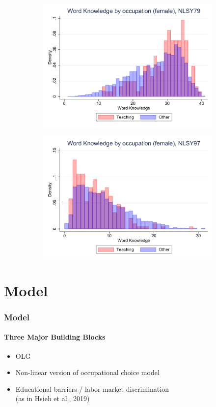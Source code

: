 \documentclass[11pt]{beamer}
\begin{document}
\begin{frame}
\begin{adjustwidth}{2em}{2em}
\begin{figure}[ht!]
\begin{subfigure}[b]{0.27\textwidth}
					\includegraphics[width=\textwidth]{plots/nlsy79_wk_occ_no_norm_female_no_lf.pdf}
				\end{subfigure}
				\hfill
				\begin{subfigure}[b]{0.27\textwidth}
					\centering
					\includegraphics[width=\textwidth]{plots/nlsy97_wk_occ_no_norm_female_no_lf.pdf}
				\end{subfigure}	
			\end{figure}
			\vfill
		\end{adjustwidth}
	\end{frame}
	
\section{Model}	
 \begin{frame}
		\frametitle{Model}
		\framesubtitle{Three Major Building Blocks}
		\begin{itemize}
			\item OLG
			\item Non-linear version of occupational choice model
			\item Educational barriers / labor market discrimination \\
			(as in Hsieh et al., 2019)
		\end{itemize}
	\end{frame}
	
\end{document}
